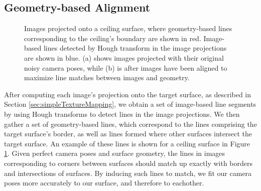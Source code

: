 \documentclass[]{spie}  %
\begin{document}
\subsection{Geometry-based Alignment}
\label{sec:geometryAlignment}


\begin{figure}
  \centering

  \centering

  \caption{Images projected onto a ceiling surface, where geometry-based lines corresponding to the ceiling's boundary are shown in red. Image-based lines detected by Hough transform in the image projections are shown in blue. (a) shows images projected with their original noisy camera poses, while (b) is after images have been aligned to maximize line matches between images and geometry.}
  \label{fig:geometryAlignment}
\end{figure}


After computing each image's projection onto the target surface, as
described in Section \ref{sec:simpleTextureMapping}, we obtain a set
of image-based line segments by using Hough transforms to detect lines
in the image projections. We then gather a set of geometry-based
lines, which correspond to the lines comprising the target surface's
border, as well as lines formed where other surfaces intersect the
target surface. An example of these lines is shown for a ceiling
surface in Figure \ref{fig:geometryAlignment}. Given perfect camera
poses and surface geometry, the lines in images corresponding to
corners between surfaces should match up exactly with borders and
intersections of surfaces. By inducing such lines to match, we fit our
camera poses more accurately to our surface, and therefore to
eachother.
\end{document}
